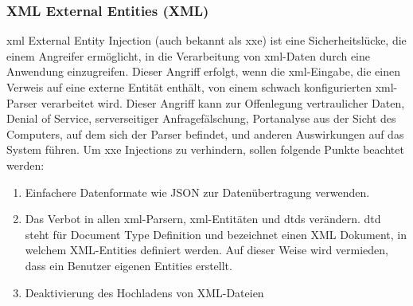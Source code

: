 \subsubsection{XML External Entities (XML)}

\acs{xml} External Entity Injection (auch bekannt als \acs{xxe}) ist eine
Sicherheitslücke, die einem Angreifer ermöglicht, in die Verarbeitung
von \acs{xml}-Daten durch eine Anwendung einzugreifen. Dieser Angriff
erfolgt, wenn die \acs{xml}-Eingabe, die einen Verweis auf eine externe
Entität enthält, von einem schwach konfigurierten \acs{xml}-Parser
verarbeitet wird. Dieser Angriff kann zur Offenlegung vertraulicher
Daten, Denial of Service, serverseitiger Anfragefälschung,
Portanalyse aus der Sicht des Computers, auf dem sich der Parser
befindet, und anderen Auswirkungen auf das System führen. Um \acs{xxe}
Injections zu verhindern, sollen folgende Punkte beachtet werden:


\begin{enumerate}
    \item Einfachere Datenformate wie JSON zur Datenübertragung verwenden.
    \item Das Verbot in allen \acs{xml}-Parsern, \acs{xml}-Entitäten
     und \acs{dtd}s verändern. \acs{dtd} steht für Document Type Definition und
     bezeichnet einen XML Dokument, in welchem XML-Entities
     definiert werden. Auf dieser Weise wird vermieden,
     dass ein Benutzer eigenen Entities erstellt.
    \item Deaktivierung des Hochladens von XML-Dateien
\end{enumerate}
